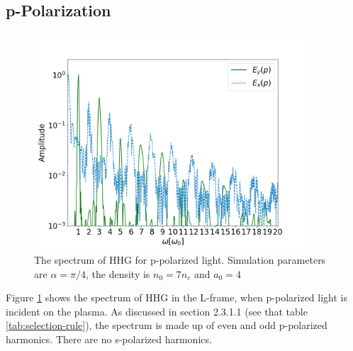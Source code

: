 \documentclass[12pt]{article}
\begin{document}
\subsection{p-Polarization}
\begin{figure}[h]
    \centering
    \includegraphics[width=0.9\textwidth]{images/p_fft.png}
    \caption{The spectrum of HHG for p-polarized light. Simulation parameters are $\alpha = \pi/4$, the density is $n_0 = 7n_c$ and $a_0 = 4$}
    \label{fig:p-fft}
\end{figure}

Figure \ref{fig:p-fft} shows the spectrum of HHG in the L-frame, when p-polarized light is incident on the plasma. As discussed in section 2.3.1.1 (see that table \ref{tab:selection-rule}), the spectrum is made up of even and odd p-polarized harmonics. There are no s-polarized harmonics.
\end{document}
